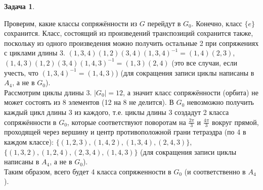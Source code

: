 \documentclass[12pt]{article}
\theoremstyle{definition}
\newtheorem{zad}{Задача}[section]
\begin{document}
\begin{zad}
\begin{itemize}
    Проверим, какие классы сопряжённости из $G$ перейдут в $G_0$. Конечно, класс $\{e\}$ сохранится. Класс, состоящий из произведений транспозиций сохранится также, поскольку из одного произведения можно получить остальные 2 при сопряжениях с циклами длины 3. $(1,3,4)(1,2)(3,4)(1,3,4)^{-1}=(1,4)(2,3)$, $(1,4,3)(1,2)(3,4)(1,4,3)^{-1}=(1,3)(2,4)$ (это все случаи, если учесть, что $(1,3,4)^{-1}=(1,4,3)$) (для сокращения записи циклы написаны в $A_4$, а не в $G_0$).\\
    Рассмотрим циклы длины 3. $|G_0|=12$, а значит класс сопряжённости (орбита) не может состоять из 8 элементов (12 на 8 не делится). В $G_0$ невозможно получить каждый цикл длины 3 из каждого, т.е. циклы длины 3 создадут 2 класса сопряжённости в $G_0$, которые соответствуют поворотам на $\frac{2\pi}{3}$ и $\frac{4\pi}{3}$ вокруг прямой, проходящей через вершину и центр противоположной грани тетраэдра (по 4 в каждом классе): $\{(1,2,3),(1,4,2),(1,3,4),(2,4,3)\}$, $\{(1,3,2),(1,2,4),(2,3,4),(1,4,3)\}$ (для сокращения записи циклы написаны в $A_4$, а не в $G_0$).\\
    Таким образом, всего будет 4 класса сопряженности в $G_0$ (и соответственно в $A_4$).
\end{itemize}
\end{zad}
\end{document}
